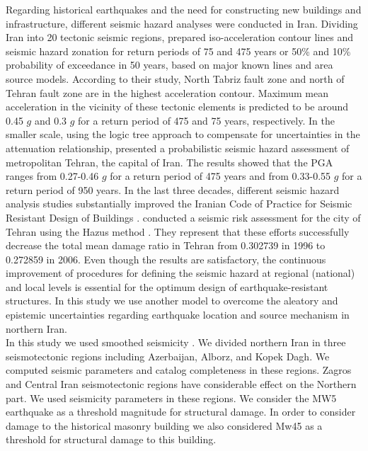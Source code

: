 \documentclass{article}
\begin{document}
\noindent
Regarding historical earthquakes and the need for constructing new buildings and infrastructure, different seismic hazard analyses were conducted in Iran. Dividing Iran into 20 tectonic seismic regions, \citet{Tavakoli1999} prepared iso-acceleration contour lines and seismic hazard zonation for return periods of 75 and 475 years or 50\% and 10\% probability of exceedance in 50 years, based on major known lines and area source models. According to their study, North Tabriz fault zone and north of Tehran fault zone are in the highest acceleration contour. Maximum mean acceleration in the vicinity of these tectonic elements is predicted to be around 0.45 $g$ and 0.3 $g$ for a return period of 475 and 75 years, respectively. In the smaller scale, using the logic tree approach to compensate for uncertainties in the attenuation relationship, \citet{Ghodrati2003} presented a probabilistic seismic hazard assessment of metropolitan Tehran, the capital of Iran. The results showed that the PGA ranges from 0.27-0.46 $g$ for a return period of 475 years and from 0.33-0.55 $g$ for a return period of 950 years. In the last three decades, different seismic hazard analysis studies substantially improved the Iranian Code of Practice for Seismic Resistant Design of Buildings \citep{BHRC2014}. \citet{Ghodrati2013} conducted a seismic risk assessment for the city of Tehran using the Hazus method \citep{FEMA2003}. They represent that these efforts successfully decrease the total mean damage ratio in Tehran from 0.302739 in 1996 to 0.272859 in 2006.  Even though the results are satisfactory, the continuous improvement of procedures for defining the seismic hazard at regional (national) and local levels is essential for the optimum design of earthquake-resistant structures. In this study we use another model to overcome the aleatory and epistemic uncertainties regarding earthquake location and source mechanism in northern Iran.\\

In this study we used smoothed seismicity \citep{Frankel1995}. We divided northern Iran in three seismotectonic regions including Azerbaijan, Alborz, and Kopek Dagh. We computed seismic parameters and catalog completeness in these regions. Zagros and Central Iran seismotectonic regions have considerable effect on the Northern part. We used \citet{Karimiparidari2013} seismicity parameters in these regions.  We consider the MW5 earthquake as a threshold magnitude  for structural damage. In order to consider damage to the historical masonry building we also considered Mw45 as a threshold for structural damage to this building. 
\end{document}
